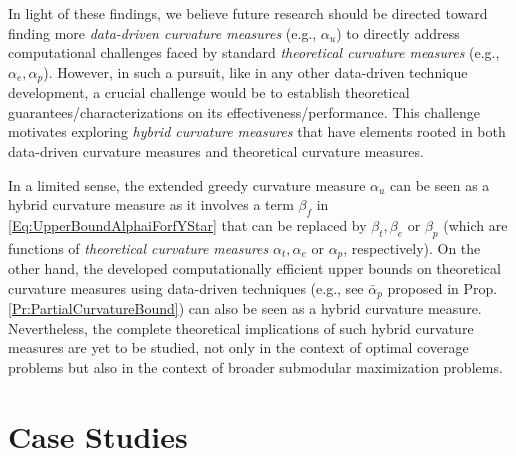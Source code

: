 \documentclass[letterpaper, 10 pt, conference]{ieeeconf}
\begin{document}
In light of these findings, we believe future research should be directed toward finding more \emph{data-driven curvature measures} (e.g., $\alpha_u$) to directly address computational challenges faced by standard \emph{theoretical curvature measures} (e.g., $\alpha_e,\alpha_p$). However, in such a pursuit, like in any other data-driven technique development, a crucial challenge would be to establish theoretical guarantees/characterizations on its effectiveness/performance. This challenge motivates exploring \emph{hybrid curvature measures} that have elements rooted in both data-driven curvature measures and theoretical curvature measures. 

In a limited sense, the extended greedy curvature measure $\alpha_u$ can be seen as a hybrid curvature measure as it involves a term $\beta_f$ in \eqref{Eq:UpperBoundAlphaiForfYStar} that can be replaced by $\beta_t,\beta_e$ or $\beta_p$ (which are functions of \emph{theoretical curvature measures} $\alpha_t,\alpha_e$ or $\alpha_p$, respectively). On the other hand, the developed computationally efficient upper bounds on theoretical curvature measures using data-driven techniques (e.g., see $\bar{\alpha}_p$ proposed in Prop. \ref{Pr:PartialCurvatureBound}) can also be seen as a hybrid curvature measure. Nevertheless, the complete theoretical implications of such hybrid curvature measures are yet to be studied, not only in the context of optimal coverage problems but also in the context of broader submodular maximization problems.      



 

\section{Case Studies}
\label{Sec:CaseStudies}
\end{document}
